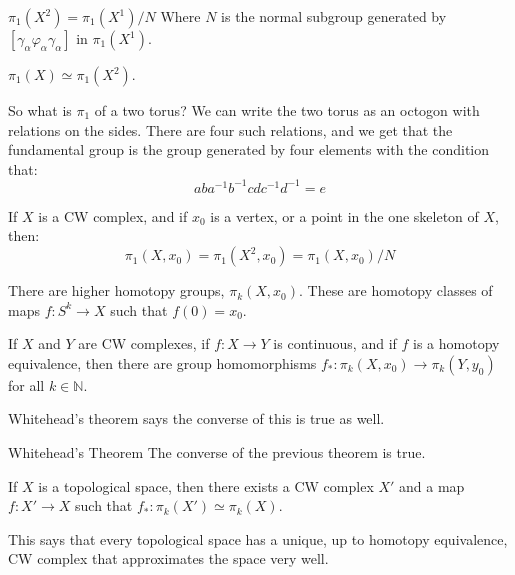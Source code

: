 \documentclass[crop=false,class=book,oneside]{standalone}
\begin{document}
            \begin{theorem}
                $\pi_{1}(X^{2})=\pi_{1}(X^{1})/N$
                Where $N$ is the normal subgroup generated by
                $[\gamma_{\alpha}\varphi_{\alpha}\gamma_{\alpha}]$
                in $\pi_{1}(X^{1})$.
            \end{theorem}
            \begin{theorem}
                $\pi_{1}(X)\simeq\pi_{1}(X^{2})$.
            \end{theorem}
            So what is $\pi_{1}$ of a two torus? We can write
            the two torus as an octogon with relations on the
            sides. There are four such relations, and we get
            that the fundamental group is the group generated by
            four elements with the condition that:
            \begin{equation}
                aba^{\minus{1}}b^{\minus{1}}
                cdc^{\minus{1}}d^{\minus{1}}=e
            \end{equation}
            \begin{theorem}
                If $X$ is a CW complex, and if
                $x_{0}$ is a vertex, or a point in the one skeleton
                of $X$, then:
                \begin{equation}
                    \pi_{1}(X,x_{0})=\pi_{1}(X^{2},x_{0})
                    =\pi_{1}(X,x_{0})/N
                \end{equation}
            \end{theorem}
            There are higher homotopy groups, $\pi_{k}(X,x_{0})$.
            These are homotopy classes of maps
            $f:S^{k}\rightarrow{X}$ such that $f(0)=x_{0}$.
            \begin{theorem}
                If $X$ and $Y$ are CW complexes, if
                $f:X\rightarrow{Y}$ is continuous, and if $f$ is
                a homotopy equivalence, then there are group
                homomorphisms
                $f_{*}:\pi_{k}(X,x_{0})\rightarrow{\pi}_{k}(Y,y_{0})$
                for all $k\in\mathbb{N}$.
            \end{theorem}
            Whitehead's theorem says the converse of this is true
            as well.
            \begin{ltheorem}{Whitehead's Theorem}
                The converse of the previous theorem is true.
            \end{ltheorem}
            \begin{theorem}
                If $X$ is a topological space, then there exists
                a CW complex $X'$ and a map
                $f:X'\rightarrow{X}$ such that
                $f_{*}:\pi_{k}(X')\simeq\pi_{k}(X)$.
            \end{theorem}
            This says that every topological space has a unique,
            up to homotopy equivalence, CW complex that approximates
            the space very well.
\end{document}
